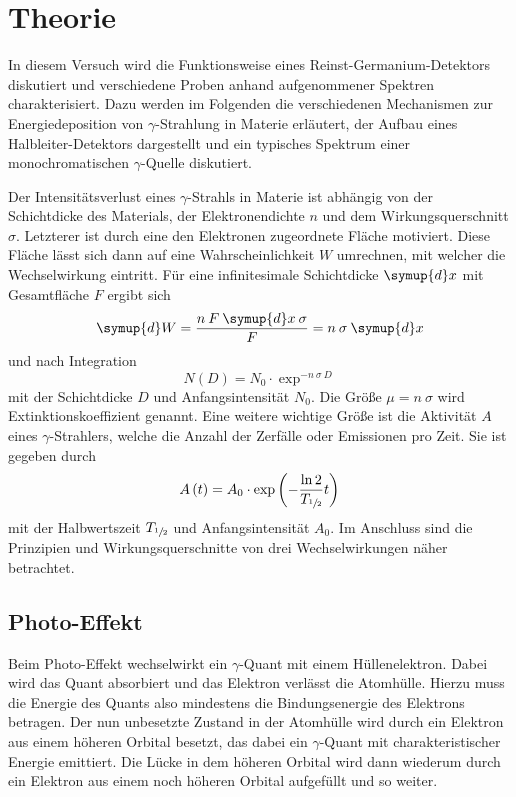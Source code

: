 \section{Theorie}
\label{sec:Theorie}

In diesem Versuch wird die Funktionsweise eines Reinst-Germanium-Detektors diskutiert
und verschiedene Proben anhand aufgenommener Spektren charakterisiert.
Dazu werden im Folgenden die verschiedenen Mechanismen zur Energiedeposition von
$\gamma$-Strahlung in Materie erläutert, der Aufbau eines Halbleiter-Detektors
dargestellt und ein typisches Spektrum einer monochromatischen $\gamma$-Quelle diskutiert.

Der Intensitätsverlust eines $\gamma$-Strahls in Materie ist abhängig von
der Schichtdicke des Materials, der Elektronendichte $n$ und dem
Wirkungsquerschnitt $\sigma$.
Letzterer ist durch eine den Elektronen zugeordnete Fläche motiviert.
Diese Fläche lässt sich dann auf eine Wahrscheinlichkeit $W$ umrechnen,
mit welcher die Wechselwirkung eintritt. Für eine infinitesimale Schichtdicke
$\symup{d}x$ mit Gesamtfläche $F$ ergibt sich
\begin{equation*}
	\symup{d}W = \frac{n\:F\:\symup{d}x\:\sigma}{F} = n\:\sigma\:\symup{d}x
\end{equation*}
und nach Integration
\begin{equation}
	N\left(D\right) = N_\text{0} \cdot \exp^{-n\:\sigma\:D}
	\label{eqn:Intensitaet-Exp}
\end{equation}
mit der Schichtdicke $D$ und Anfangsintensität $N_\text{0}$.
Die Größe $\mu = n\:\sigma$ wird Extinktionskoeffizient genannt.
Eine weitere wichtige Größe ist die Aktivität $A$ eines $\gamma$-Strahlers,
welche die Anzahl der Zerfälle oder Emissionen pro Zeit.
Sie ist gegeben durch
\begin{equation}
	A\left(t\right) = A_0 \cdot \exp\left(-\frac{\ln 2}{T_{\sfrac{1}{2}}} t\right)
	\label{eqn:AktivitaetFormel}
\end{equation}
mit der Halbwertszeit $T_{\sfrac{1}{2}}$ und Anfangsintensität $A_0$.
Im Anschluss sind die Prinzipien und Wirkungsquerschnitte von drei
Wechselwirkungen näher betrachtet.

\subsection{Photo-Effekt}
\label{sec:Photo-Effekt}

Beim Photo-Effekt wechselwirkt ein $\gamma$-Quant mit einem Hüllenelektron. Dabei
wird das Quant absorbiert und das Elektron verlässt die Atomhülle.
Hierzu muss die Energie des Quants also mindestens die Bindungsenergie des
Elektrons betragen.
Der nun unbesetzte Zustand in der Atomhülle wird durch ein Elektron aus
einem höheren Orbital besetzt, das dabei ein $\gamma$-Quant mit charakteristischer
Energie emittiert. Die Lücke in dem höheren Orbital wird dann wiederum durch
ein Elektron aus einem noch höheren Orbital aufgefüllt und so weiter.

